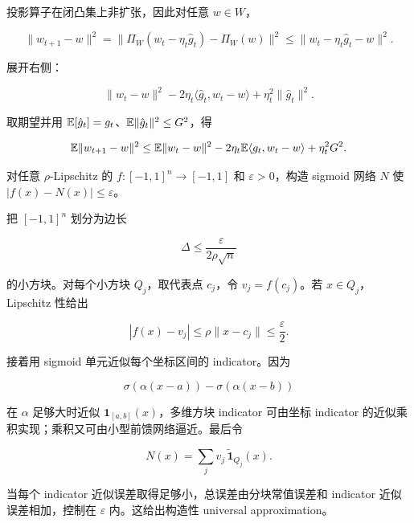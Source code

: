 \solution
投影算子在闭凸集上非扩张，因此对任意 \(w\in W\)，

\[
  \|w_{t+1}-w\|^2
  =
  \|\Pi_W(w_t-\eta_t\hat g_t)-\Pi_W(w)\|^2
  \le
  \|w_t-\eta_t\hat g_t-w\|^2.
\]

展开右侧：

\[
  \|w_t-w\|^2
  -
  2\eta_t\langle \hat g_t,w_t-w\rangle
  +
  \eta_t^2\|\hat g_t\|^2.
\]

取期望并用 \(\mathbb{E}[\hat g_t]=g_t\)、\(\mathbb{E}\|\hat g_t\|^2\le G^2\)，得

\[
  \mathbb{E}\|w_{t+1}-w\|^2
  \le
  \mathbb{E}\|w_t-w\|^2
  -
  2\eta_t\mathbb{E}\langle g_t,w_t-w\rangle
  +
  \eta_t^2G^2.
\]

\begin{examproblem}
对任意 \(\rho\)-Lipschitz 的 \(f:[-1,1]^n\to[-1,1]\) 和 \(\varepsilon>0\)，构造 sigmoid 网络 \(N\) 使 \(|f(x)-N(x)|\le\varepsilon\)。
\end{examproblem}

\solution
把 \([-1,1]^n\) 划分为边长

\[
  \Delta\le \frac{\varepsilon}{2\rho\sqrt n}
\]

的小方块。对每个小方块 \(Q_j\)，取代表点 \(c_j\)，令 \(v_j=f(c_j)\)。若 \(x\in Q_j\)，Lipschitz 性给出

\[
  |f(x)-v_j|\le \rho\|x-c_j\|\le \frac{\varepsilon}{2}.
\]

接着用 sigmoid 单元近似每个坐标区间的 indicator。因为

\[
  \sigma(\alpha(x-a))-\sigma(\alpha(x-b))
\]

在 \(\alpha\) 足够大时近似 \(\mathbf{1}_{[a,b]}(x)\)，多维方块 indicator 可由坐标 indicator 的近似乘积实现；乘积又可由小型前馈网络逼近。最后令

\[
  N(x)=\sum_j v_j\,\widetilde{\mathbf{1}}_{Q_j}(x).
\]

当每个 indicator 近似误差取得足够小，总误差由分块常值误差和 indicator 近似误差相加，控制在 \(\varepsilon\) 内。这给出构造性 universal approximation。

